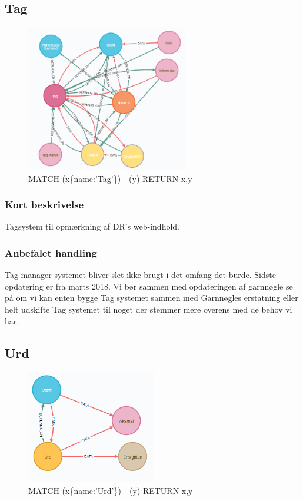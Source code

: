 \documentclass{article}
\begin{document}
\subsection{Tag}
\begin{figure}[h]
\includegraphics[width=200pt]{Tag.PNG}
\caption{MATCH (x\{name:'Tag'\})- -(y) RETURN x,y}
\end{figure}
\subsubsection*{Kort beskrivelse}
Tagsystem til opmærkning af DR's web-indhold.
\subsubsection*{Anbefalet handling}
Tag manager systemet bliver slet ikke brugt i det omfang det burde. Sidste opdatering er fra marts 2018. Vi bør sammen med opdateringen af garnnøgle se på om vi kan enten bygge Tag systemet sammen med Garnnøgles erstatning eller helt udskifte Tag systemet til noget der stemmer mere overens med de behov vi har.



\subsection{Urd}
\begin{figure}[h]
\includegraphics[width=160pt]{Urd.PNG}
\caption{MATCH (x\{name:'Urd'\})- -(y) RETURN x,y}
\end{figure}
\end{document}
